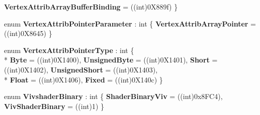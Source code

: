 \begin{DoxyCompactItemize}
{\bfseries Vertex\-Attrib\-Array\-Buffer\-Binding} = ((int)0\-X889f)
 \}
\item 
enum {\bfseries Vertex\-Attrib\-Pointer\-Parameter} \-: int \{ {\bfseries Vertex\-Attrib\-Array\-Pointer} = ((int)0\-X8645)
 \}
\item 
enum {\bfseries Vertex\-Attrib\-Pointer\-Type} \-: int \{ \\*
{\bfseries Byte} = ((int)0\-X1400), 
{\bfseries Unsigned\-Byte} = ((int)0\-X1401), 
{\bfseries Short} = ((int)0\-X1402), 
{\bfseries Unsigned\-Short} = ((int)0\-X1403), 
\\*
{\bfseries Float} = ((int)0\-X1406), 
{\bfseries Fixed} = ((int)0\-X140c)
 \}
\item 
enum {\bfseries Vivshader\-Binary} \-: int \{ {\bfseries Shader\-Binary\-Viv} = ((int)0x8\-F\-C4), 
{\bfseries Viv\-Shader\-Binary} = ((int)1)
 \}
\end{DoxyCompactItemize}
